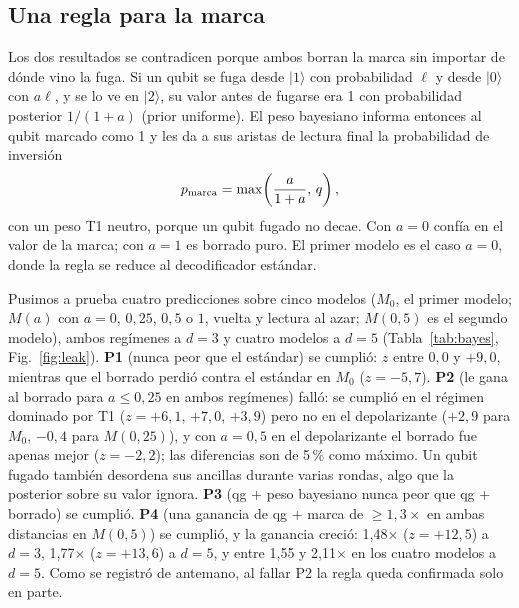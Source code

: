 \documentclass[11pt]{article}
\begin{document}
\subsection{Una regla para la marca}\label{sec:bayes}

Los dos resultados se contradicen porque ambos borran la marca sin importar de dónde vino la fuga. Si
un qubit se fuga desde $|1\rangle$ con probabilidad $\ell$ y desde $|0\rangle$ con $a\ell$, y se lo ve en
$|2\rangle$, su valor antes de fugarse era 1 con probabilidad posterior $1/(1+a)$ (prior uniforme). El
peso bayesiano informa entonces al qubit marcado como 1 y les da a sus aristas de lectura final la
probabilidad de inversión
\begin{equation}\label{eq:pflag}
p_{\rm marca}=\max\!\left(\frac{a}{1+a},\,q\right),
\end{equation}
con un peso T1 neutro, porque un qubit fugado no decae. Con $a=0$ confía en el valor de la marca; con
$a=1$ es borrado puro. El primer modelo es el caso $a=0$, donde la regla se reduce al decodificador
estándar.

Pusimos a prueba cuatro predicciones sobre cinco modelos ($M_0$, el primer modelo; $M(a)$ con $a=0$,
$0{,}25$, $0{,}5$ o $1$, vuelta y lectura al azar; $M(0{,}5)$ es el segundo modelo), ambos regímenes a
$d=3$ y cuatro modelos a $d=5$ (Tabla~\ref{tab:bayes}, Fig.~\ref{fig:leak}). \textbf{P1} (nunca peor
que el estándar) se cumplió: $z$ entre $0{,}0$ y $+9{,}0$, mientras que el borrado perdió contra el
estándar en $M_0$ ($z=-5{,}7$). \textbf{P2} (le gana al borrado para $a\le0{,}25$ en ambos regímenes)
falló: se cumplió en el régimen dominado por T1 ($z=+6{,}1$, $+7{,}0$, $+3{,}9$) pero no en el
depolarizante ($+2{,}9$ para $M_0$, $-0{,}4$ para $M(0{,}25)$), y con $a=0{,}5$ en el depolarizante el
borrado fue apenas mejor ($z=-2{,}2$); las diferencias son de 5\,\% como máximo. Un qubit fugado
también desordena sus ancillas durante varias rondas, algo que la posterior sobre su valor ignora.
\textbf{P3} (qg + peso bayesiano nunca peor que qg + borrado) se cumplió. \textbf{P4} (una ganancia de
qg + marca de $\ge1{,}3\times$ en ambas distancias en $M(0{,}5)$) se cumplió, y la ganancia creció:
1{,}48$\times$ ($z=+12{,}5$) a $d=3$, 1{,}77$\times$ ($z=+13{,}6$) a $d=5$, y entre 1{,}55 y
2{,}11$\times$ en los cuatro modelos a $d=5$. Como se registró de antemano, al fallar P2 la regla queda
confirmada solo en parte.
\end{document}
